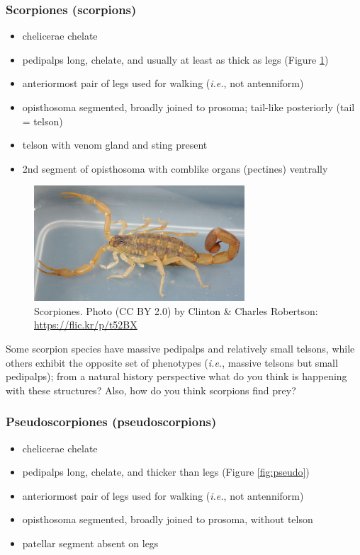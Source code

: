 \documentclass[letterpaper, 11pt]{article}
\begin{document}
\subsubsection*{Scorpiones (scorpions)}
\begin{itemize}
\item chelicerae chelate
\item pedipalps long, chelate, and usually at least as thick as legs (Figure \ref{fig:scorpion})
\item anteriormost pair of legs used for walking (\textit{i.e.}, not antenniform)
\item opisthosoma segmented, broadly joined to prosoma; tail-like posteriorly (tail = telson)
\item telson with venom gland and sting present
\item 2nd segment of opisthosoma with comblike organs (pectines) ventrally 
\end{itemize}

\begin{figure}[ht!]
  \centering
    \includegraphics[width=0.7\textwidth]{scorpion}
  \caption{Scorpiones. Photo (CC BY 2.0) by Clinton \& Charles Robertson: \url{https://flic.kr/p/t52BX}}
  \label{fig:scorpion}
\end{figure}
\noindent{}Some scorpion species have massive pedipalps and relatively small telsons, while others exhibit the opposite set of phenotypes (\textit{i.e.}, massive telsons but small pedipalps); from a natural history perspective what do you think is happening with these structures? Also, how do you think scorpions find prey?\vspace{5cm}

\subsubsection*{Pseudoscorpiones (pseudoscorpions)}
\begin{itemize}
\item chelicerae chelate
\item pedipalps long, chelate, and thicker than legs (Figure \ref{fig:pseudo})
\item anteriormost pair of legs used for walking (\textit{i.e.}, not antenniform)
\item opisthosoma segmented, broadly joined to prosoma, without telson
\item patellar segment absent on legs
\end{itemize}
\end{document}
